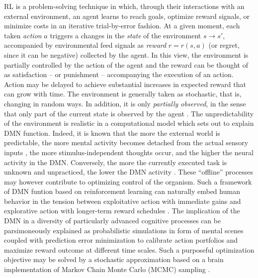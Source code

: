 \documentclass[10pt,letterpaper]{article}
\begin{document}
RL is a problem-solving technique in which, through their interactions with an external environment,
an agent learns to reach goals, optimize reward signals, or minimize costs
in an iterative trial-by-error fashion.
At a given moment, each taken \textit{action} $a$ triggers a changes in the
\textit{state} of the environment
$s \rightarrow s'$, accompanied by environmental feed signals as \textit{reward}
$r = r(s, a)$ (or regret, since it can be negative) collected by the
agent.
In this view, the environment is partially controlled by
the action of the agent and the reward can be thought
of as satisfaction -- or punishment -- accompanying the execution of
an action.
Action may be delayed to achieve substantial increases in expected reward
that can grow with time.
The environment is generally taken as stochastic,
that is, changing in random ways. In addition,
it is only \textit{partially observed},
in the sense that only part of the current state is observed by
the agent \citep{starkweather2017dopamine}.
The unpredictability of the environment
is realistic in a computational model which sets out
to explain DMN function. Indeed, it is known that the more the external world is predictable,
the more mental activity becomes detached from the actual sensory inputs
\citep{antrobus1966studies, pope1978regulation},
the more stimulus-independent thoughts occur, and
the higher the neural activity in the DMN.
Conversely, the more the currently executed task is unknown and unpracticed,
the lower the DMN activity
\citep{filler1973daydreaming, teasdale1995stimulus}.
%
These ``offline'' processes may however contribute to
optimizing control of the organism.
Such a framework of DMN funtion based on reinforcement learning
can naturally embed human behavior
in the tension between exploitative action with immediate gains and
explorative action with longer-term reward schedules
\citep{dayan2008decision}.
The implication of the DMN in a diversity of
particularly advanced cognitive processes
can be parsimoneously explained as probabilistic simulations in form of mental scenes coupled with prediction error minimization
to calibrate action portfolios and
maximize reward outcome at different time scales.
Such a purposeful optimization objective
may be solved by a stochastic approximation
based on a brain implementation of Markov Chain Monte Carlo (MCMC) sampling
\citep{tenenbaum2011grow}.
\end{document}
